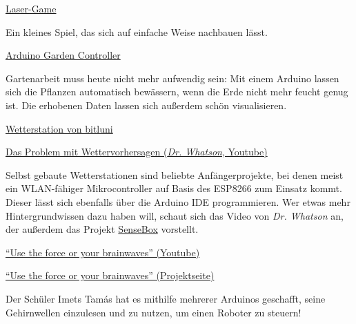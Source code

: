 \vfill
\begin{links}
	\item \href{https://www.instructables.com/id/Arduino-UNO-Laser-Game/}{Laser-Game}
	
	Ein kleines Spiel, das sich auf einfache Weise nachbauen lässt.
	
	\item \href{https://www.youtube.com/watch?v=O_Q1WKCtWiA}{Arduino Garden Controller}
	
	Gartenarbeit muss heute nicht mehr aufwendig sein: Mit einem Arduino lassen sich die Pflanzen automatisch bewässern, wenn die Erde nicht mehr feucht genug ist. Die erhobenen Daten lassen sich außerdem schön visualisieren.
	
	\item \href{https://www.youtube.com/watch?v=at7wmm9t8UE}{Wetterstation von bitluni}
	
	\href{https://www.youtube.com/watch?v=aHkec8bA8iI}{Das Problem mit Wettervorhersagen (\emph{Dr. Whatson}, Youtube)}
	
	Selbst gebaute Wetterstationen sind beliebte Anfängerprojekte, bei denen meist ein WLAN-fähiger Mikrocontroller auf Basis des ESP8266 zum Einsatz kommt. Dieser lässt sich ebenfalls über die Arduino IDE programmieren. Wer etwas mehr Hintergrundwissen dazu haben will, schaut sich das Video von \emph{Dr. Whatson} an, der außerdem das Projekt \href{https://www.sensebox.de/}{SenseBox} vorstellt.
	
	\item \href{https://www.youtube.com/watch?v=KtSCo6hIlRQ}{\enquote{Use the force or your brainwaves} (Youtube)}
	
	\href{https://create.arduino.cc/projecthub/Imetomi/use-the-force-or-your-brainwaves-9e839b}{\enquote{Use the force or your brainwaves} (Projektseite)}
		
	Der Schüler Imets Tamás hat es mithilfe mehrerer Arduinos geschafft, seine Gehirnwellen einzulesen und zu nutzen, um einen Roboter zu steuern!
\end{links}